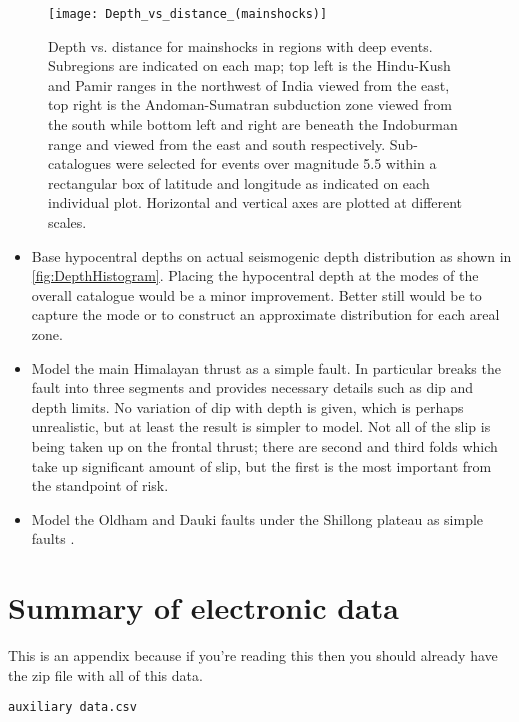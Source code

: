 \documentclass{article}
\begin{document}
\begin{appendices}
\begin{figure}[!htb]
\begin{adjustbox}{center}
\texttt{[image: Depth\_vs\_distance\_(mainshocks)]}
\end{adjustbox}
\caption[Depth vs.
distance for mainshocks in regions with deep events]{Depth vs.
distance for mainshocks in regions with deep events.
Subregions are indicated on each map; top left is the Hindu-Kush and Pamir ranges in the northwest of India viewed from the east, top right is the Andoman-Sumatran subduction zone viewed from the south while bottom left and right are beneath the Indoburman range and viewed from the east and south respectively.
Sub-catalogues were selected for events over magnitude 5.5 within a rectangular box of latitude and longitude as indicated on each individual plot.
 Horizontal and vertical axes are plotted at different scales.}
\label{fig:DepthVsDistance}
\end{figure}

\begin{itemize}
\item Base hypocentral depths on actual seismogenic depth distribution as shown in \autoref{fig:DepthHistogram}.
Placing the hypocentral depth at the modes of the overall catalogue would be a minor improvement.
Better still would be to capture the mode or to construct an approximate distribution for each areal zone.
\item Model the main Himalayan thrust as a simple fault.
In particular \cite{berryman2014himalayan} breaks the fault into three segments and provides necessary details such as dip and depth limits.
No variation of dip with depth is given, which is perhaps unrealistic, but at least the result is simpler to model.
Not all of the slip is being taken up on the frontal thrust; there are second and third folds which take up significant amount of slip, but the first is the most important from the standpoint of risk.
\item Model the Oldham and Dauki faults under the Shillong plateau as simple faults \citep{Bilham2001}.
\end{itemize}

\section{Summary of electronic data}
\label{app:Jobs}

This is an appendix because if you're reading this then you should already have the zip file with all of this data.

\texttt{auxiliary data.csv} 



\end{appendices}
\end{document}
